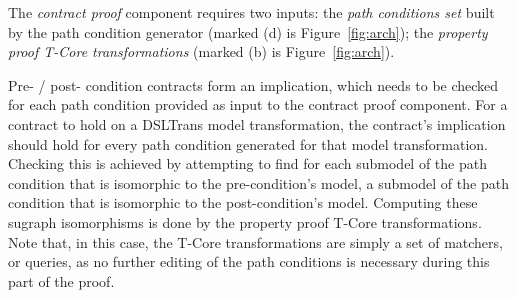 The \emph{contract proof} component requires two inputs: the \emph{path
conditions set} built by the path condition generator (marked (d) is Figure~\ref{fig:arch}); the \emph{property
proof T-Core transformations} (marked (b) is Figure~\ref{fig:arch}).

Pre- / post- condition contracts form an implication, which needs to be
checked for each path condition provided as input to the contract proof
component. For a contract to hold on a DSLTrans model transformation, the
contract's implication should hold for every path condition generated for
that model transformation. Checking this is achieved by attempting to find for
each submodel of the path condition that is isomorphic to the pre-condition's model, a submodel
of the path condition that is isomorphic to the post-condition's model.
Computing these sugraph isomorphisms is done by the property proof T-Core
transformations. Note that, in this case, the T-Core transformations are simply a set of matchers, or queries, as no further
editing of the path conditions is necessary during this part of the proof.




